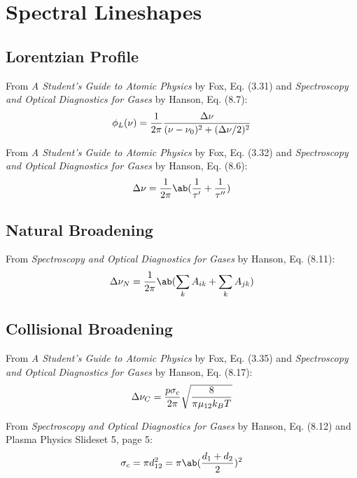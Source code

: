 \documentclass[11pt, twoside, fleqn]{report}
\begin{document}
\section{Spectral Lineshapes}

\subsection{Lorentzian Profile}

From \textit{A Student's Guide to Atomic Physics} by Fox, Eq. (3.31) and \textit{Spectroscopy and Optical Diagnostics for Gases} by Hanson, Eq. (8.7):
\begin{equation*}
    \phi_L(\nu) = \frac{1}{2\pi}\frac{\adif{\nu}}{(\nu - \nu_0)^2 + (\adif{\nu}/2)^2}
\end{equation*}

From \textit{A Student's Guide to Atomic Physics} by Fox, Eq. (3.32) and \textit{Spectroscopy and Optical Diagnostics for Gases} by Hanson, Eq. (8.6):
\begin{equation*}
    \adif{\nu} = \frac{1}{2\pi}\ab(\frac{1}{\tau'} + \frac{1}{\tau''})
\end{equation*}

\subsection{Natural Broadening}

From \textit{Spectroscopy and Optical Diagnostics for Gases} by Hanson, Eq. (8.11):
\begin{equation*}
    \adif{\nu}_N = \frac{1}{2\pi}\ab(\sum_k A_{ik} + \sum_k A_{jk})
\end{equation*}

\subsection{Collisional Broadening}

From \textit{A Student's Guide to Atomic Physics} by Fox, Eq. (3.35) and \textit{Spectroscopy and Optical Diagnostics for Gases} by Hanson, Eq. (8.17):
\begin{equation*}
    \adif{\nu}_C = \frac{p\sigma_c}{2\pi}\sqrt{\frac{8}{\pi\mu_{12}k_BT}}
\end{equation*}

From \textit{Spectroscopy and Optical Diagnostics for Gases} by Hanson, Eq. (8.12) and Plasma Physics Slideset 5, page 5:
\begin{equation*}
    \sigma_c = \pi d_{12}^2 = \pi\ab(\frac{d_1 + d_2}{2})^2
\end{equation*}
\end{document}
